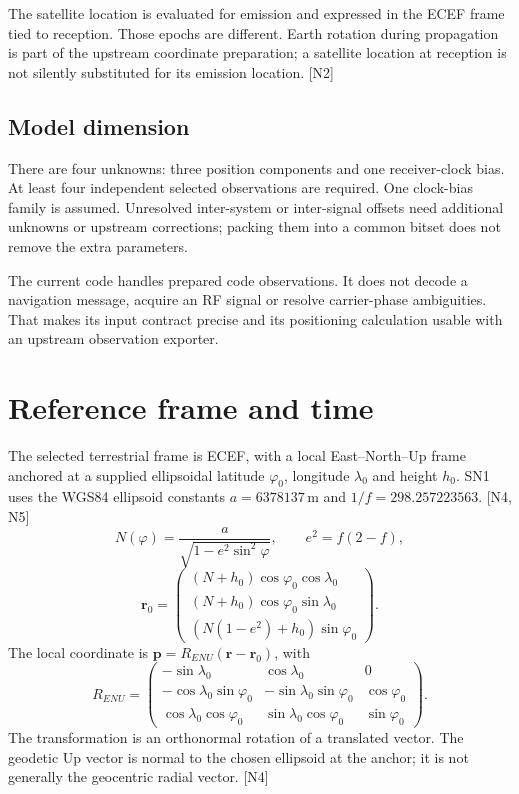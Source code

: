 \documentclass[11pt,a4paper]{article}
\begin{document}
The satellite location is evaluated for emission and expressed in the ECEF frame tied to reception.
Those epochs are different. Earth rotation during propagation is part of the upstream coordinate
preparation; a satellite location at reception is not silently substituted for its emission location. [N2]

\subsection{Model dimension}
There are four unknowns: three position components and one receiver-clock bias. At least four independent
selected observations are required. One clock-bias family is assumed. Unresolved inter-system or inter-signal
offsets need additional unknowns or upstream corrections; packing them into a common bitset does not remove
the extra parameters.

The current code handles prepared code observations. It does not decode a navigation message, acquire an RF
signal or resolve carrier-phase ambiguities. That makes its input contract precise and its positioning calculation
usable with an upstream observation exporter.
\clearpage

\section{Reference frame and time}
The selected terrestrial frame is ECEF, with a local East--North--Up frame anchored at a supplied ellipsoidal
latitude $\varphi_0$, longitude $\lambda_0$ and height $h_0$. SN1 uses the WGS84 ellipsoid constants
$a=6378137\,\mathrm m$ and $1/f=298.257223563$. [N4, N5]
\begin{equation}
N(\varphi)=\frac a{\sqrt{1-e^2\sin^2\varphi}},\qquad e^2=f(2-f),
\end{equation}
\begin{equation}
\mathbf r_0=\begin{pmatrix}(N+h_0)\cos\varphi_0\cos\lambda_0\\
(N+h_0)\cos\varphi_0\sin\lambda_0\\(N(1-e^2)+h_0)\sin\varphi_0\end{pmatrix}.
\end{equation}
The local coordinate is $\mathbf p=R_{ENU}(\mathbf r-\mathbf r_0)$, with
\begin{equation}
R_{ENU}=\begin{pmatrix}
-\sin\lambda_0&\cos\lambda_0&0\\
-\cos\lambda_0\sin\varphi_0&-\sin\lambda_0\sin\varphi_0&\cos\varphi_0\\
\cos\lambda_0\cos\varphi_0&\sin\lambda_0\cos\varphi_0&\sin\varphi_0
\end{pmatrix}.
\end{equation}
The transformation is an orthonormal rotation of a translated vector. The geodetic Up vector is normal to
the chosen ellipsoid at the anchor; it is not generally the geocentric radial vector. [N4]
\end{document}
